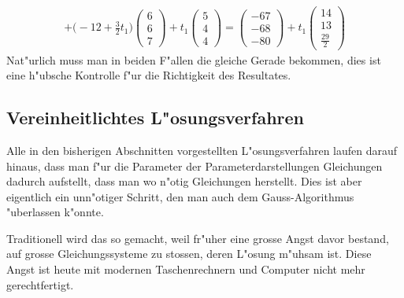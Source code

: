 \begin{beispiel}
\begin{align*}
+\biggl(-12+\frac32t_1\biggr)\begin{pmatrix}6\\6\\7\end{pmatrix}
+t_1\begin{pmatrix}5\\4\\4\end{pmatrix}
=
\begin{pmatrix}-67\\-68\\-80\end{pmatrix}
+t_1
\begin{pmatrix}14\\13\\\frac{29}2\end{pmatrix}
\end{align*}
Nat"urlich muss man in beiden F"allen die gleiche Gerade bekommen,
dies ist eine h"ubsche Kontrolle f"ur die Richtigkeit des Resultates.
\end{beispiel}

\subsection{Vereinheitlichtes L"osungsverfahren\label{section-vereinheitlichtes-verfahren}}
Alle in den bisherigen Abschnitten vorgestellten L"osungsverfahren
laufen darauf hinaus, dass man f"ur die Parameter der Parameterdarstellungen
Gleichungen dadurch aufstellt, dass man wo n"otig Gleichungen herstellt.
Dies ist aber eigentlich ein unn"otiger Schritt, den man auch dem
Gauss-Algorithmus "uberlassen k"onnte.

Traditionell wird das so gemacht, weil fr"uher eine grosse Angst
davor bestand, auf grosse Gleichungssysteme zu stossen, deren L"osung
m"uhsam ist.
Diese Angst ist heute mit modernen Taschenrechnern und
Computer nicht mehr gerechtfertigt.

